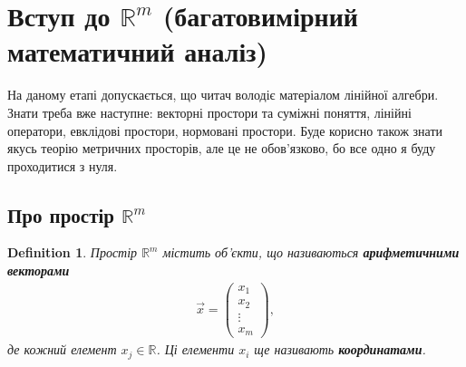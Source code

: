 \documentclass[a4paper, 10pt]{article}
\theoremstyle{theoremdd}
\theoremstyle{theoremdd}
\theoremstyle{theoremdd}
\newtheorem{definition}[theorem]{Definition}
\theoremstyle{theoremdd}
\theoremstyle{theoremdd}
\theoremstyle{theoremdd}
\theoremstyle{theoremdd}
\theoremstyle{theoremdd}
\theoremstyle{theoremdd}
\begin{document}
\section{Вступ до $\mathbb{R}^m$ (багатовимірний математичний аналіз)}
На даному етапі допускається, що читач володіє матеріалом лінійної алгебри. Знати треба вже наступне: векторні простори та суміжні поняття, лінійні оператори, евклідові простори, нормовані простори. Буде корисно також знати якусь теорію метричних просторів, але це не обов'язково, бо все одно я буду проходитися з нуля.

\subsection{Про простір $\mathbb{R}^m$}
\begin{definition}
Простір $\mathbb{R}^m$ містить об'єкти, що називаються \textbf{арифметичними векторами}
\begin{align*}
\vec{x} = \begin{pmatrix}
x_1 \\ x_2 \\ \vdots \\ x_m
\end{pmatrix},
\end{align*}
де кожний елемент $x_j \in \mathbb{R}$. Ці елементи $x_i$ ще називають \textbf{координатами}.
\end{definition}
\end{document}
